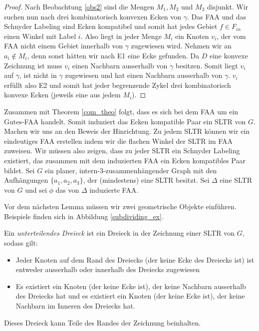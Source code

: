 \begin{proof}
Nach Beobachtung \ref{obs2} sind die Mengen $M_1,M_2$ und $M_3$ disjunkt. Wir suchen nun nach drei kombinatorisch konvexen Ecken von $\gamma$. Das FAA und das Schnyder Labeling sind Ecken kompatibel und somit hat jedes Gebiet $f \in F_{in}$ einen Winkel mit Label $i$. Also liegt in jeder Menge $M_i$ ein Knoten $v_i$, der vom FAA nicht einem Gebiet innerhalb von $\gamma$ zugewiesen wird. Nehmen wir an $a_i \notin M_i$, denn sonst hätten wir nach E1 eine Ecke gefunden. Da $D$ eine konvexe Zeichnung ist muss $v_i$ einen Nachbarn ausserhalb von $\gamma$ besitzen. Somit liegt $v_i$ auf $\gamma$, ist nicht in $\gamma$ zugewiesen und hat einen Nachbarn ausserhalb von $\gamma$. $v_i$ erfüllt also E2 und somit hat jeder begrenzende Zykel drei kombinatorisch konvexe Ecken (jeweils eine aus jedem $M_i$).
\end{proof}

Zusammen mit Theorem \ref{com_theo} folgt, dass es sich bei dem FAA um ein Gutes-FAA handelt. Somit induziert das Ecken kompatible Paar ein SLTR von $G$.\\

Machen wir uns an den Beweis der Hinrichtung. Zu jedem SLTR können wir ein eindeutiges FAA erstellen indem wir die flachen Winkel der SLTR im FAA zuweisen. Wir müssen also zeigen, dass zu jeder SLTR ein Schnyder Labeling existiert, das zusammen mit dem induzierten FAA ein Ecken kompatibles Paar bildet. Sei $G$ ein planer, intern-3-zusammenhängender Graph mit den Aufhängungen $\{a_1,a_2,a_3\}$, der (mindestens) eine SLTR besitzt. Sei $\Delta$ eine SLTR von $G$ und sei $\phi$ das von $\Delta$ induzierte FAA.

Vor dem nächsten Lemma müssen wir zwei geometrische Objekte einführen. Beispiele finden sich in Abbildung \ref{subdividing_ex}.

\begin{definition}
Ein \textit{unterteilendes Dreieck} ist ein Dreieck in der Zeichnung einer SLTR von $G$, sodass gilt:
\begin{itemize}
\item Jeder Knoten auf dem Rand des Dreiecks (der keine Ecke des Dreiecks ist) ist entweder ausserhalb oder innerhalb des Dreiecks zugewiesen
\item Es existiert ein Knoten (der keine Ecke ist), der keine Nachbarn ausserhalb des Dreiecks hat und es existiert ein Knoten (der keine Ecke ist), der keine Nachbarn im Inneren des Dreiecks hat.
\end{itemize}
Dieses Dreieck kann Teile des Randes der Zeichnung beinhalten.
\end{definition}


